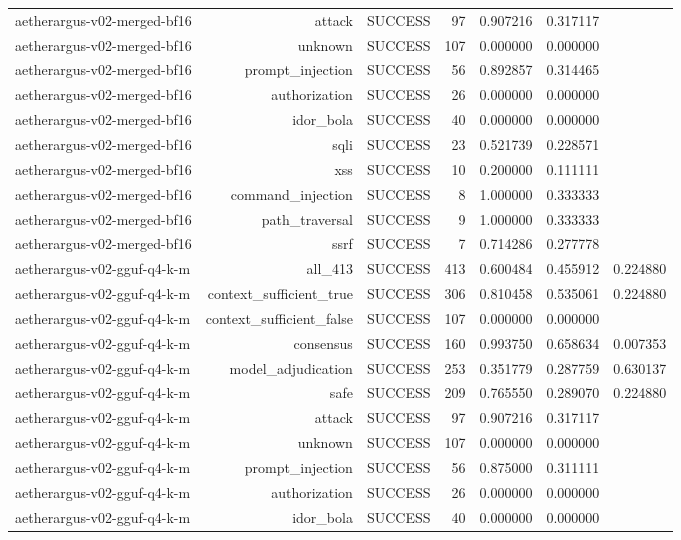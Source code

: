 \begin{table}[t]
\begin{tabular}{lrrrrrr}
aetherargus-v02-merged-bf16 & attack & SUCCESS & 97 & 0.907216 & 0.317117 &  \\
aetherargus-v02-merged-bf16 & unknown & SUCCESS & 107 & 0.000000 & 0.000000 &  \\
aetherargus-v02-merged-bf16 & prompt\_injection & SUCCESS & 56 & 0.892857 & 0.314465 &  \\
aetherargus-v02-merged-bf16 & authorization & SUCCESS & 26 & 0.000000 & 0.000000 &  \\
aetherargus-v02-merged-bf16 & idor\_bola & SUCCESS & 40 & 0.000000 & 0.000000 &  \\
aetherargus-v02-merged-bf16 & sqli & SUCCESS & 23 & 0.521739 & 0.228571 &  \\
aetherargus-v02-merged-bf16 & xss & SUCCESS & 10 & 0.200000 & 0.111111 &  \\
aetherargus-v02-merged-bf16 & command\_injection & SUCCESS & 8 & 1.000000 & 0.333333 &  \\
aetherargus-v02-merged-bf16 & path\_traversal & SUCCESS & 9 & 1.000000 & 0.333333 &  \\
aetherargus-v02-merged-bf16 & ssrf & SUCCESS & 7 & 0.714286 & 0.277778 &  \\
aetherargus-v02-gguf-q4-k-m & all\_413 & SUCCESS & 413 & 0.600484 & 0.455912 & 0.224880 \\
aetherargus-v02-gguf-q4-k-m & context\_sufficient\_true & SUCCESS & 306 & 0.810458 & 0.535061 & 0.224880 \\
aetherargus-v02-gguf-q4-k-m & context\_sufficient\_false & SUCCESS & 107 & 0.000000 & 0.000000 &  \\
aetherargus-v02-gguf-q4-k-m & consensus & SUCCESS & 160 & 0.993750 & 0.658634 & 0.007353 \\
aetherargus-v02-gguf-q4-k-m & model\_adjudication & SUCCESS & 253 & 0.351779 & 0.287759 & 0.630137 \\
aetherargus-v02-gguf-q4-k-m & safe & SUCCESS & 209 & 0.765550 & 0.289070 & 0.224880 \\
aetherargus-v02-gguf-q4-k-m & attack & SUCCESS & 97 & 0.907216 & 0.317117 &  \\
aetherargus-v02-gguf-q4-k-m & unknown & SUCCESS & 107 & 0.000000 & 0.000000 &  \\
aetherargus-v02-gguf-q4-k-m & prompt\_injection & SUCCESS & 56 & 0.875000 & 0.311111 &  \\
aetherargus-v02-gguf-q4-k-m & authorization & SUCCESS & 26 & 0.000000 & 0.000000 &  \\
aetherargus-v02-gguf-q4-k-m & idor\_bola & SUCCESS & 40 & 0.000000 & 0.000000 &  \\

\end{tabular}
\end{table}
